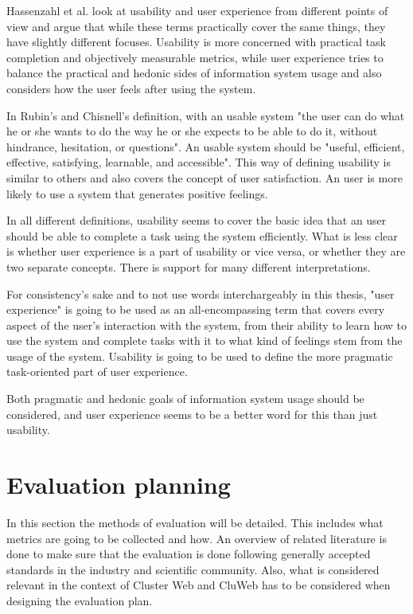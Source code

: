 Hassenzahl et al. look at usability and user experience from different points of view and argue that while these terms practically cover the same things, they have slightly different focuses. Usability is more concerned with practical task completion and objectively measurable metrics, while user experience tries to balance the practical and hedonic sides of information system usage and also considers how the user feels after using the system.
\cite{hassenzahl2006user}

In Rubin's and Chisnell's definition, with an usable system "the user can do what he or she wants to do the way he or she expects to be able to do it, without hindrance, hesitation, or questions". An usable system should be "useful, efficient, effective, satisfying, learnable, and accessible". \cite{rubin2008handbook} This way of defining usability is similar to others and also covers the concept of user satisfaction. An user is more likely to use a system that generates positive feelings.

In all different definitions, usability seems to cover the basic idea that an user should be able to complete a task using the system efficiently. What is less clear is whether user experience is a part of usability or vice versa, or whether they are two separate concepts. There is support for many different interpretations.

For consistency's sake and  to not use words interchargeably in this thesis, "user experience" is going to be used as an all-encompassing term that covers every aspect of the user's interaction with the system, from their ability to learn how to use the system and complete tasks with it to what kind of feelings stem from the usage of the system. Usability is going to be used to define the more pragmatic task-oriented part of user experience.

Both pragmatic and hedonic goals of information system usage should be considered, and user experience seems to be a better word for this than just usability.

\section{Evaluation planning}
In this section the methods of evaluation will be detailed. This includes what metrics are going to be collected and how. An overview of related literature is done to make sure that the evaluation is done following generally accepted standards in the industry and scientific community. Also, what is considered relevant in the context of Cluster Web and CluWeb has to be considered when designing the evaluation plan.

